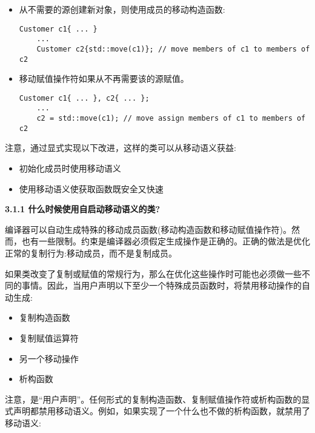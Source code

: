\begin{itemize}
	\item 从不需要的源创建新对象，则使用成员的移动构造函数:\par
	\begin{lstlisting}[caption={}]
	Customer c1{ ... }
	...
	Customer c2{std::move(c1)}; // move members of c1 to members of c2
	\end{lstlisting}
	\item 移动赋值操作符如果从不再需要该的源赋值。\par
	\begin{lstlisting}[caption={}]
	Customer c1{ ... }, c2{ ... };
	...
	c2 = std::move(c1); // move assign members of c1 to members of c2
	\end{lstlisting}
\end{itemize}

注意，通过显式实现以下改进，这样的类可以从移动语义获益:\par

\begin{itemize}
	\item 初始化成员时使用移动语义
	\item 使用移动语义使获取函数既安全又快速
\end{itemize}

\hspace*{\fill} \par %
\textbf{3.1.1 什么时候使用自启动移动语义的类?}

编译器可以自动生成特殊的移动成员函数(移动构造函数和移动赋值操作符)。然而，也有一些限制。约束是编译器必须假定生成操作是正确的。正确的做法是优化正常的复制行为:移动成员，而不是复制成员。\par

如果类改变了复制或赋值的常规行为，那么在优化这些操作时可能也必须做一些不同的事情。因此，当用户声明以下至少一个特殊成员函数时，将禁用移动操作的自动生成:\par

\begin{itemize}
	\item 复制构造函数
	\item 复制赋值运算符
	\item 另一个移动操作
	\item 析构函数
\end{itemize}

注意，是“用户声明”。任何形式的复制构造函数、复制赋值操作符或析构函数的显式声明都禁用移动语义。例如，如果实现了一个什么也不做的析构函数，就禁用了移动语义:\par

